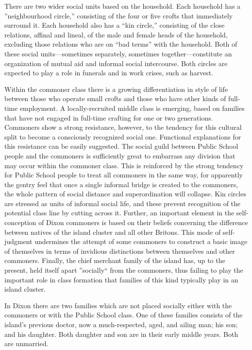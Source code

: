 \documentclass[twoside,symmetric,nobib,justified]{tufte-book}
\begin{document}
There are two wider social units based on the household. Each household
has a ''neighbourhood circle,'' consisting of the four or five crofts
that immediately surround it. Each household also has a ``kin circle,''
consisting of the close relations, affinal and lineal, of the male and
female heads of the household, excluding those relations who are on
``bad terms'' with the household. Both of these social units---sometimes
separately, sometimes together---constitute an organization of mutual
aid and informal social intercourse. Both circles are expected to play a
role in funerals and in work crises, such as harvest.

Within the commoner class there is a growing differentiation in style of
life between those who operate small crofts and those who have other
kinds of full-time employment. A locally-recruited middle class is
emerging, based on families that have not engaged in full-time crafting
for one or two generations. Commoners show a strong resistance, however,
to the tendency for this cultural split to become a consciously
recognized social one. Functional explanations for this resistance can
be easily suggested. The social guild between Public School people and
the commoners is sufficiently great to embarrass any division that may
occur within the commoner class. This is reinforced by the strong
tendency for Public School people to treat all commoners in the same
way, for apparently the gentry feel that once a single informal bridge
is created to the commoners, the whole pattern of social distance and
superordination will collapse. Kin circles are stressed as units of
informal social life, and these prevent recognition of the potential
class line by cutting across it. Further, an important element in the
self-conception of Dixon commoners is based on their beliefs concerning
the difference between natives of the island cluster and all other
Britons. This mode of self-judgment undermines the attempt of some
commoners to construct a basic image of themselves in terms of invidious
distinctions between themselves and other commoners. Finally, the chief
merchant family of the island has, up to the present, held itself apart
''socially`` from the commoners, thus failing to play the important role
in class formation that families of this kind typically play in an
island cluster.

In Dixon there are two families which are not placed socially either
with the commoners or with the Public School class. One of these
families consists of the island's previous doctor, now a much-respected,
aged, and ailing man; his son; and his daughter. Both daughter and son
are in their early middle years. Both are unmarried.
\end{document}

